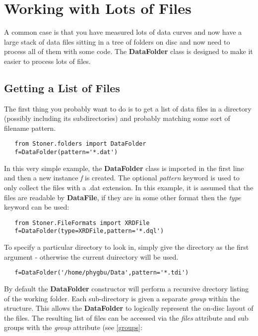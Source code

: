 \documentclass[a4paper,11pt]{scrartcl}
\begin{document}
\section{Working with Lots of Files}\label{DataFolder}

A common case is that you have measured lots of data curves and now have a large stack of data files sitting in a tree of folders on disc and now need to process all of them with some code. The \textbf{DataFolder} class is designed to make it easier to process lots of files.

\subsection{Getting a List of Files}

The first thing you probably want to do is to get a list of data files in a directory (possibly including its subdirectories) and probably matching some sort of filename pattern.

\begin{lstlisting}
   from Stoner.folders import DataFolder
   f=DataFolder(pattern='*.dat')
\end{lstlisting}

In this very simple example, the \textbf{DataFolder} class is imported in the first line and then a new instance \textit{f} is created. The optional \textit{pattern} keyword is used to only collect the files with a .dat extension. In this example, it is assumed that the files are readable by \textbf{DataFile}, if they are in some other format then the \textit{type} keyword can be used:

\begin{lstlisting}
   from Stoner.FileFormats import XRDFile
   f=DataFolder(type=XRDFile,pattern='*.dql')
\end{lstlisting}

To specify a particular directory to look in, simply give the directory as the first argument - otherwise the current duirectory will be used.

\begin{lstlisting}
   f=DataFolder('/home/phygbu/Data',pattern='*.tdi')
\end{lstlisting}

By default the \textbf{DataFolder} constructor will perform a recursive drectory listing of the working folder. Each sub-directory is given a separate \textit{group} within the structure. This allows the \textbf{DataFolder} to logically represent the on-disc layout of the files. The resulting list of files can be accessed via the \textit{files} attribute and sub groups with the \textit{group} attribute (see \ref{groups}:
\end{document}
